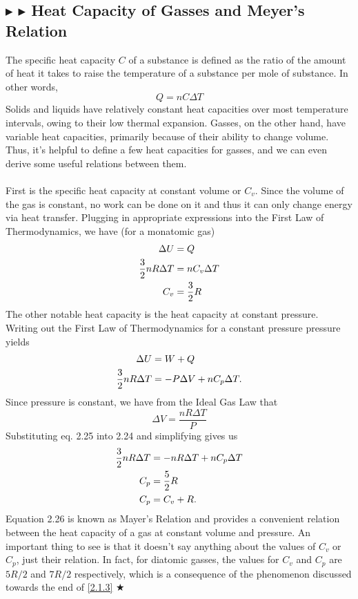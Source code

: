 \subsection{\color{RoyalBlue} $\blacktriangleright$ \color{Orchid} $\blacktriangleright$ \color{black} Heat Capacity of Gasses and Meyer's Relation}\label{2.2.2}
The specific heat capacity $C$ of a substance is defined as the ratio of the amount of heat it takes to raise the temperature of a substance per mole of substance. In other words,
\begin{equation}
    Q = nC\Delta T
\end{equation}
\noindent Solids and liquids have relatively constant heat capacities over most temperature intervals, owing to their low thermal expansion. Gasses, on the other hand, have variable heat capacities, primarily because of their ability to change volume. Thus, it's helpful to define a few heat capacities for gasses, and we can even derive some useful relations between them.\\
\\
\noindent First is the specific heat capacity at constant volume or $C_v$. Since the volume of the gas is constant, no work can be done on it and thus it can only change energy via heat transfer. Plugging in appropriate expressions into the First Law of Thermodynamics, we have (for a monatomic gas)
\begin{align}
    \Delta U &= Q \nonumber \\
    \frac32 nR\Delta T &= nC_v\Delta T \nonumber \\
    C_v &= \frac32R
\end{align}
\noindent The other notable heat capacity is the heat capacity at constant pressure. Writing out the First Law of Thermodynamics for a constant pressure pressure yields
\begin{align}
    \Delta U &= W +Q \nonumber \\
    \frac32 nR\Delta T &= -P\Delta V + nC_p\Delta T .
\end{align}
\noindent Since pressure is constant, we have from the Ideal Gas Law that 
\begin{equation}
    \Delta V = \frac{nR\Delta T}{P}
\end{equation}
\noindent Substituting eq. 2.25 into 2.24 and simplifying gives us
\begin{align}
    \frac32 nR\Delta T &= -nR\Delta T + nC_p\Delta T \nonumber \\
    C_p &= \frac52R \nonumber \\
    C_p &= C_v + R.
\end{align}
\noindent Equation 2.26 is known as Mayer's Relation and provides a convenient relation between the heat capacity of a gas at constant volume and pressure. An important thing to see is that it doesn't say anything about the values of $C_v$ or $C_p$, just their relation. In fact, for diatomic gasses, the values for $C_v$ and $C_p$ are $5R/2$ and $7R/2$ respectively, which is a consequence of the phenomenon discussed towards the end of \ref{2.1.3} $\bigstar$ 

